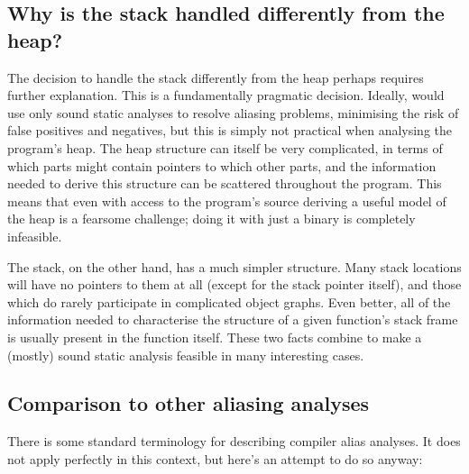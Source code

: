 \subsection{Why is the stack handled differently from the heap?}

The decision to handle the stack differently from the heap perhaps
requires further explanation.  This is a fundamentally pragmatic
decision.  Ideally, {\technique} would use only sound static analyses
to resolve aliasing problems, minimising the risk of false positives
and negatives, but this is simply not practical when analysing the
program's heap.  The heap structure can itself be very complicated, in
terms of which parts might contain pointers to which other parts, and
the information needed to derive this structure can be scattered
throughout the program.  This means that even with access to the
program's source deriving a useful model of the heap is a fearsome
challenge\needCite{}; doing it with just a binary is completely
infeasible.

The stack, on the other hand, has a much simpler structure.  Many
stack locations will have no pointers to them at all (except for the
stack pointer itself), and those which do rarely participate in
complicated object graphs.  Even better, all of the information needed
to characterise the structure of a given function's stack frame is
usually present in the function itself.  These two facts combine to
make a (mostly) sound static analysis feasible in many interesting
cases.


\subsection{Comparison to other aliasing analyses}



There is some standard terminology for describing compiler alias
analyses.  It does not apply perfectly in
this context, but here's an attempt to do so anyway:

